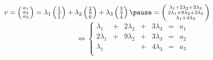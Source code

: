 \begin{frame}
\begin{exemple}
\begin{enumerate}
$ v = \left( \begin{smallmatrix}a_1\\ a_2\\ a_3\end{smallmatrix}\right) = \lambda_1 \left(\begin{smallmatrix}1\\2\\1\end{smallmatrix} \right) + \lambda_2
      \left(\begin{smallmatrix}2\\9\\0\end{smallmatrix} \right)+ \lambda_3 \left(\begin{smallmatrix}3\\3\\4\end{smallmatrix}\right)
     \pause
      = \left(\begin{smallmatrix}\lambda_1 + 2\lambda_2 + 3\lambda_3\\ 2\lambda_1 + 9
      \lambda_2 + 3\lambda_3\\ \lambda_1 + 4\lambda_3\end{smallmatrix}\right)
$\pause
$$ \iff
   \left\{
\begin{array}{ccccccc}
\lambda_1 &+ &2\lambda_2 &+ &3\lambda_3 & = & a_1\\
2\lambda_1 &+ &9\lambda_2 &+ &3\lambda_3 & = & a_2\\
\lambda_1 &&& + &4\lambda_3 & = & a_3\\
\end{array} \right.
$$ 
\end{enumerate}
\end{exemple}
\end{frame}



